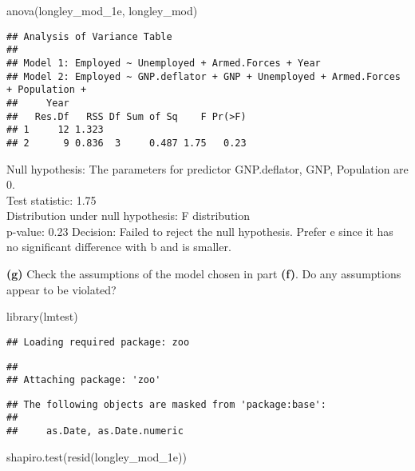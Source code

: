 \documentclass[
]{article}
\newenvironment{Shaded}{\begin{snugshade}}{\end{snugshade}}
\newcommand{\FunctionTok}[1]{\textcolor[rgb]{0.00,0.00,0.00}{#1}}
\newcommand{\NormalTok}[1]{#1}
\begin{document}
\begin{Shaded}
\begin{Highlighting}[]
\FunctionTok{anova}\NormalTok{(longley\_mod\_1e, longley\_mod)}
\end{Highlighting}
\end{Shaded}

\begin{verbatim}
## Analysis of Variance Table
## 
## Model 1: Employed ~ Unemployed + Armed.Forces + Year
## Model 2: Employed ~ GNP.deflator + GNP + Unemployed + Armed.Forces + Population + 
##     Year
##   Res.Df   RSS Df Sum of Sq    F Pr(>F)
## 1     12 1.323                         
## 2      9 0.836  3     0.487 1.75   0.23
\end{verbatim}

Null hypothesis: The parameters for predictor GNP.deflator, GNP,
Population are 0.\\
Test statistic: 1.75\\
Distribution under null hypothesis: F distribution\\
p-value: 0.23 Decision: Failed to reject the null hypothesis. Prefer e
since it has no significant difference with b and is smaller.

\textbf{(g)} Check the assumptions of the model chosen in part
\textbf{(f)}. Do any assumptions appear to be violated?

\begin{Shaded}
\begin{Highlighting}[]
\FunctionTok{library}\NormalTok{(lmtest)}
\end{Highlighting}
\end{Shaded}

\begin{verbatim}
## Loading required package: zoo
\end{verbatim}

\begin{verbatim}
## 
## Attaching package: 'zoo'
\end{verbatim}

\begin{verbatim}
## The following objects are masked from 'package:base':
## 
##     as.Date, as.Date.numeric
\end{verbatim}

\begin{Shaded}
\begin{Highlighting}[]
\FunctionTok{shapiro.test}\NormalTok{(}\FunctionTok{resid}\NormalTok{(longley\_mod\_1e))}
\end{Highlighting}
\end{Shaded}
\end{document}
